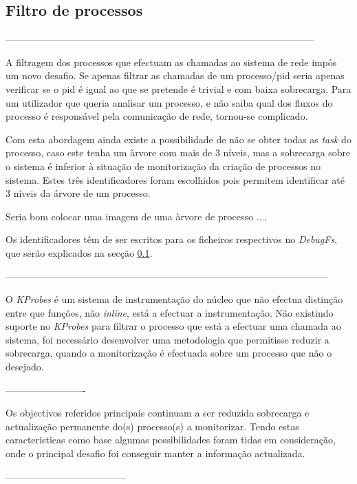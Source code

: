 \subsection{Filtro de processos}

------------------------------------------------------------------------------------------------

A filtragem dos processos que efectuam as chamadas ao sistema de rede impôs um novo desafio.
 Se apenas filtrar as chamadas de um processo/pid seria apenas verificar se o pid é igual ao que se pretende é trivial e com baixa sobrecarga.
 Para um utilizador que queria analisar um processo, e não saiba qual dos fluxos do processo é responsável pela comunicação de rede, tornou-se complicado.

Com esta abordagem ainda existe a possibilidade de não se obter todas as \textit{task} do processo, caso este tenha um àrvore com mais de 3 níveis, mas a sobrecarga sobre o sistema é inferior à situação de monitorização da criação de processos no sistema.
 Estes três identificadores foram escolhidos pois permitem identificar até 3 níveis da árvore de um processo.

Seria bom colocar uma imagem de uma àrvore de processo .... 

Os identificadores têm de ser escritos para os ficheiros respectivos no \textit{DebugFs}, que serão explicados na secção \ref{}.

-----------------------------------------------------------------------------------------------------

O \textit{KProbes} é um sistema de instrumentação do núcleo que não efectua distinção entre que funções, não \textit{inline}, está a efectuar a instrumentação.
Não existindo suporte no \textit{KProbes} para filtrar o processo que está a efectuar uma chamada ao sistema, foi necessário desenvolver uma metodologia que permitisse reduzir a sobrecarga, quando a monitorização é efectuada sobre um processo que não o desejado.

-------------------------

Os objectivos referidos principais continuam a ser reduzida sobrecarga e actualização permanente do(s) processo(s) a monitorizar.
Tendo estas caracteristicas como base algumas possibilidades foram tidas em consideração, onde o principal desafio foi conseguir manter a informação actualizada.

--------------------------------------

